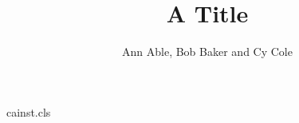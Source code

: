 \begin{filecontents*}[overwrite]{cainst.cls}
\def\inst#1{\unskip$^{#1}$}
\def\institute#1{\gdef\@institute{\it #1}}
\def\institutename{\par\begingroup\parindent=0pt\setcounter{@inst}{1}%
  \def\and{\par\stepcounter{@inst}\noindent$^{\the@inst}$\enspace\ignorespaces}%
  \noindent$^{1}$\enspace\ignorespaces\@institute\par\endgroup}
\def\@maketitle{\begin{center}{\LARGE\@title\par}\vskip1em{\large\@author\par}\end{center}
  {\small\institutename}\vskip1em}
\end{filecontents*}
\documentclass{cainst}

\title{A Title}
\author{Ann Able, Bob Baker and Cy Cole}
\maketitle
Text.

